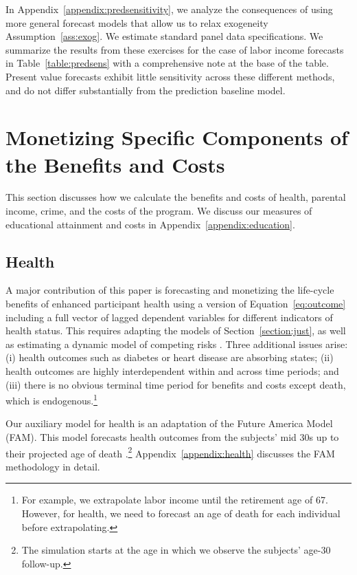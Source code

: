 In Appendix~\ref{appendix:predsensitivity}, we analyze the consequences of using more general forecast models that allow us to relax exogeneity Assumption~\ref{ass:exog}. We estimate standard panel data specifications. We summarize the results from these exercises for the case of labor income forecasts in Table~\ref{table:predsens} with a comprehensive note at the base of the table. Present value forecasts exhibit little sensitivity across these different methods, and do not differ substantially from the prediction baseline model.

\section{Monetizing Specific Components of the Benefits and Costs}
\label{section:monetizing-benefits-costs}

This section discusses how we calculate the benefits and costs of health, parental income, crime, and the costs of the program. We discuss our measures of educational attainment and costs in Appendix~\ref{appendix:education}.

\subsection{Health} \label{section:health}

A major contribution of this paper is forecasting and monetizing the life-cycle benefits of enhanced participant health using a version of Equation~\eqref{eq:outcome} including a full vector of lagged dependent variables for different indicators of health status. This requires adapting the models of Section~\ref{section:just}, as well as estimating a dynamic model of competing risks \citep{Kalbfleisch_Prentice_1980_failure}. Three additional issues arise: (i) health outcomes such as diabetes or heart disease are absorbing states; (ii) health outcomes are highly interdependent within and across time periods; and (iii) there is no obvious terminal time period for benefits and costs except death, which is endogenous.\footnote{For example, we extrapolate labor income until the retirement age of 67. However, for health, we need to forecast an age of death for each individual before extrapolating.}

Our auxiliary model for health is an adaptation of the Future America Model (FAM). This model forecasts health outcomes from the subjects' mid 30s up to their projected age of death \citep{Goldman_etal_2015_Future-Elderly-Model-Report}.\footnote{The simulation starts at the age in which we observe the subjects' age-30 follow-up.}  Appendix~\ref{appendix:health} discusses the FAM methodology in detail.


